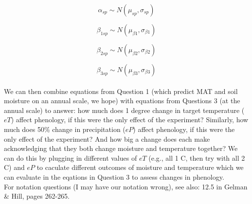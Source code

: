\documentclass[12pt,a4paper]{article}
\begin{document}
\begin{equation}
\alpha_{sp} \sim N(\mu_{sp}, \sigma_{sp})
\end{equation}

\begin{equation}
\beta_{1 sp} \sim N(\mu_{\beta1}, \sigma_{\beta1})
\end{equation}

\begin{equation}
\beta_{2 sp} \sim N(\mu_{\beta2}, \sigma_{\beta2})
\end{equation}

\begin{equation}
\beta_{3 sp} \sim N(\mu_{\beta3}, \sigma_{\beta3})
\end{equation}
\vspace{2ex}\\

\noindent We can then combine equations from Question 1 (which predict MAT and soil moisture on an annual scale, we hope) with equations from Questions 3 (at the annual scale) to answer: how much does 1 degree change in target temperature ($eT$) affect phenology, if this were the only effect of the experiment? Similarly, how much does 50\% change in precipitation ($eP$) affect phenology, if this were the only effect of the experiment? And how big a change does each make acknowledging that they both change moisture and temperature together? We can do this by plugging in different values of $eT$ (e.g., all 1 C, then try with all 2 C) and $eP$ to caculate different outcomes of moisture and temperature which we can evaluate in the eqations in Question 3 to assess changes in phenology. \\

\noindent For notation questions (I may have our notation wrong), see also: 12.5 in Gelman \& Hill, pages 262-265.
\end{document}
